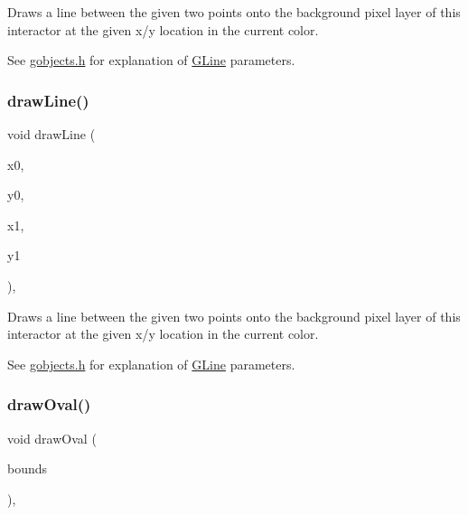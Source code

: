 Draws a line between the given two points onto the background pixel layer of this interactor at the given x/y location in the current color. 

See \mbox{\hyperlink{gobjects_8h_source}{gobjects.\+h}} for explanation of \mbox{\hyperlink{classGLine}{G\+Line}} parameters. \mbox{\label{classGDrawingSurface_aff299fe83178d2f3ce8c08c06b583484}} 
\subsubsection{\texorpdfstring{draw\+Line()}{drawLine()}\hspace{0.1cm}{\footnotesize\ttfamily [2/2]}}
{\footnotesize\ttfamily void draw\+Line (\begin{DoxyParamCaption}\item[{double}]{x0,  }\item[{double}]{y0,  }\item[{double}]{x1,  }\item[{double}]{y1 }\end{DoxyParamCaption})\hspace{0.3cm}{\ttfamily [virtual]}, {\ttfamily [inherited]}}



Draws a line between the given two points onto the background pixel layer of this interactor at the given x/y location in the current color. 

See \mbox{\hyperlink{gobjects_8h_source}{gobjects.\+h}} for explanation of \mbox{\hyperlink{classGLine}{G\+Line}} parameters. \mbox{\label{classGDrawingSurface_a8adc13027efe311b4a6a715205b8bc46}} 
\subsubsection{\texorpdfstring{draw\+Oval()}{drawOval()}\hspace{0.1cm}{\footnotesize\ttfamily [1/2]}}
{\footnotesize\ttfamily void draw\+Oval (\begin{DoxyParamCaption}\item[{const \mbox{\hyperlink{classGRectangle}{G\+Rectangle}} \&}]{bounds }\end{DoxyParamCaption})\hspace{0.3cm}{\ttfamily [virtual]}, {\ttfamily [inherited]}}



